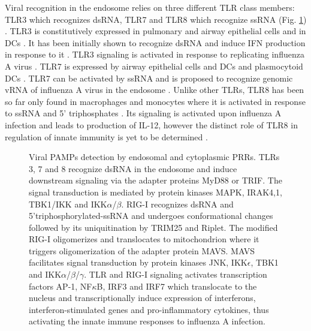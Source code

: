 		Viral recognition in the endosome relies on three different \gls{TLR} class members: \gls{TLR}3 which recognizes dsRNA, \gls{TLR}7 and \gls{TLR}8 which recognize ssRNA (Fig. \ref{fig:detection}) \parencite{Iwasaki2014}. \gls{TLR}3 is constitutively expressed in pulmonary and airway epithelial  cells and in \glspl{DC} \parencite{Guillot2005, Schulz2005, Ioannidis2013}. It has been initially shown to recognize dsRNA and induce \gls{IFN} production in response to it \parencite{Alexopoulou2001, Guillot2005}. \gls{TLR}3 signaling is activated in response to replicating influenza A virus \parencite{Guillot2005}. 	\gls{TLR}7 is expressed by airway epithelial cells and \gls{DC}s and plasmocytoid \gls{DC}s \parencite{Ioannidis2013, Lund2004}. \gls{TLR}7 can be activated by \gls{ssRNA} and is proposed to recognize genomic vRNA of influenza A virus in the endosome \parencite{Diebold2004}. Unlike other \glspl{TLR}, \gls{TLR}8 has been so far only found in macrophages and monocytes where it is activated in response to \gls{ssRNA} and 5' triphosphates \parencite{Ablasser2009}. Its signaling is activated upon influenza A infection and leads to production of \gls{IL}-12, however the distinct role of \gls{TLR}8 in regulation of innate immunity is yet to be determined \parencite{Lee2013a}.
		
		
		\begin{figure}[h!]
					\centering
					\caption{Viral \glspl{PAMP} detection by endosomal and cytoplasmic \glspl{PRR}. \glspl{TLR} 3, 7 and 8 recognize dsRNA in the endosome and induce downstream signaling via the adapter proteins MyD88 or TRIF. The signal transduction is mediated by protein kinases MAPK, IRAK4,1, TBK1/IKK and IKK$\alpha$/$\beta$. \gls{RIG-I} recognizes dsRNA and 5'triphosphorylated-ssRNA and undergoes conformational changes followed by its uniquitination by TRIM25 and Riplet. The modified RIG-I oligomerizes and translocates to mitochondrion where it triggers oligomerization of the adapter protein MAVS. MAVS facilitates signal transduction by protein kinases JNK, IKK$\epsilon$, TBK1 and IKK$\alpha$/$\beta$/$\gamma$. \gls{TLR} and \gls{RIG-I} signaling activates transcription factors AP-1, NF$\kappa$B, IRF3 and IRF7 which translocate to the nucleus and transcriptionally induce expression of interferons, interferon-stimulated genes and pro-inflammatory cytokines, thus activating the innate immune responses to influenza A infection.} \label{fig:detection}
				\end{figure}	
		

